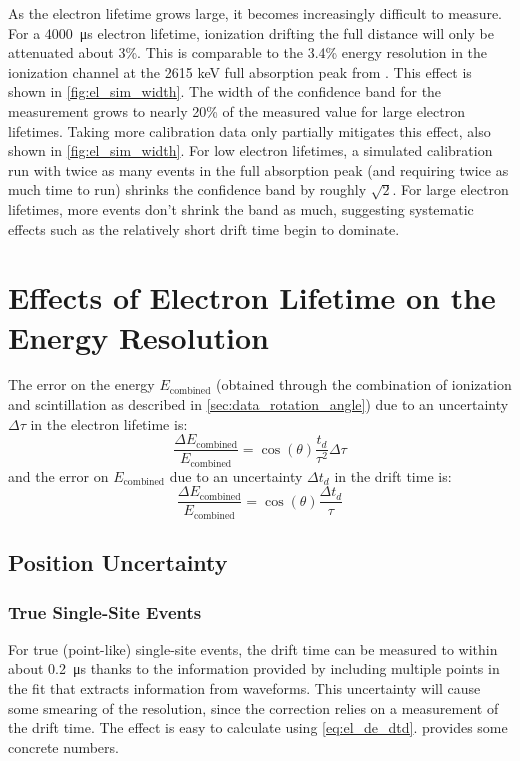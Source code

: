 \documentclass[herrin-thesis.tex]{subfiles}
\begin{document}
As the electron lifetime grows large, it becomes increasingly difficult to measure. For a \SI{4000}{\micro\second} electron lifetime, ionization drifting the full distance will only be attenuated about 3\%. This is comparable to the 3.4\% energy resolution in the ionization channel at the 2615 keV full absorption peak from . This effect is shown in \cref{fig:el_sim_width}. The width of the confidence band for the measurement grows to nearly 20\% of the measured value for large electron lifetimes. Taking more calibration data only partially mitigates this effect, also shown in \cref{fig:el_sim_width}. For low electron lifetimes, a simulated calibration run with twice as many events in the full absorption peak (and requiring twice as much time to run) shrinks the confidence band by roughly \(\sqrt{2}\). For large electron lifetimes, more events don't shrink the band as much, suggesting systematic effects such as the relatively short drift time begin to dominate.

\section{Effects of Electron Lifetime on the Energy Resolution}

The error on the energy \(E_\text{combined}\) (obtained through the combination of ionization and scintillation as described in \cref{sec:data_rotation_angle}) due to an uncertainty \(\Delta\tau\) in the electron lifetime is:
\begin{equation}
\frac{\Delta E_\text{combined}}{E_\text{combined}} = \cos(\theta) \frac{t_d}{\tau^2}\Delta\tau
\label{eq:el_de_dtau}
\end{equation}
and the error on \(E_\text{combined}\) due to an uncertainty \(\Delta t_d\) in the drift time is:
\begin{equation}
\frac{\Delta E_\text{combined}}{E_\text{combined}} = \cos(\theta) \frac{\Delta t_d}{\tau}
\label{eq:el_de_dtd}
\end{equation}

\subsection{Position Uncertainty}
\subsubsection{True Single-Site Events}
For true (point-like) single-site events, the drift time can be measured to within about \SI{0.2}{\micro\second} thanks to the information provided by including multiple points in the fit that extracts information from waveforms. This uncertainty will cause some smearing of the resolution, since the correction relies on a measurement of the drift time. The effect is easy to calculate using \cref{eq:el_de_dtd}.  provides some concrete numbers.
\end{document}
